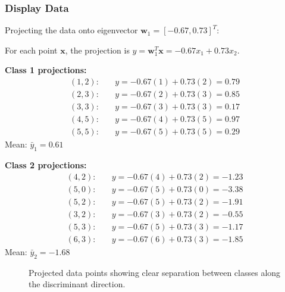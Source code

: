 \documentclass[12pt]{article}
\begin{document}
\subsubsection{Display Data}

Projecting the data onto eigenvector $\mathbf{w}_1 = [-0.67, 0.73]^T$:

For each point $\mathbf{x}$, the projection is $y = \mathbf{w}_1^T \mathbf{x} = -0.67x_1 + 0.73x_2$.

\textbf{Class 1 projections:}
\begin{align*}
    (1,2): &\quad y = -0.67(1) + 0.73(2) = 0.79 \\
    (2,3): &\quad y = -0.67(2) + 0.73(3) = 0.85 \\
    (3,3): &\quad y = -0.67(3) + 0.73(3) = 0.17 \\
    (4,5): &\quad y = -0.67(4) + 0.73(5) = 0.97 \\
    (5,5): &\quad y = -0.67(5) + 0.73(5) = 0.29
\end{align*}
Mean: $\bar{y}_1 = 0.61$

\textbf{Class 2 projections:}
\begin{align*}
    (4,2): &\quad y = -0.67(4) + 0.73(2) = -1.23 \\
    (5,0): &\quad y = -0.67(5) + 0.73(0) = -3.38 \\
    (5,2): &\quad y = -0.67(5) + 0.73(2) = -1.91 \\
    (3,2): &\quad y = -0.67(3) + 0.73(2) = -0.55 \\
    (5,3): &\quad y = -0.67(5) + 0.73(3) = -1.17 \\
    (6,3): &\quad y = -0.67(6) + 0.73(3) = -1.85
\end{align*}
Mean: $\bar{y}_2 = -1.68$

\begin{figure}[H]
\centering
{}
\caption{Projected data points showing clear separation between classes along the discriminant direction.}
\end{figure}
\end{document}
